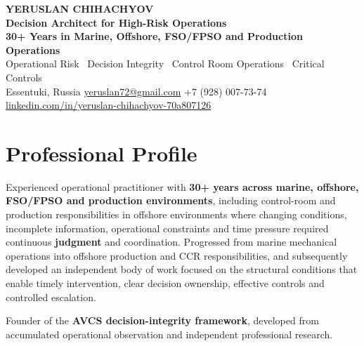 \documentclass[11pt,a4paper]{article}
\begin{document}
\begin{center}
    {\Huge\bfseries\color{avcsdark} YERUSLAN CHIHACHYOV} \\[6pt]
    {\large\bfseries Decision Architect for High-Risk Operations} \\[4pt]
    {\small\bfseries 30+ Years in Marine, Offshore, FSO/FPSO and Production Operations} \\[2pt]
    {\small Operational Risk \textbar\ Decision Integrity \textbar\ Control Room Operations \textbar\ Critical Controls} \\[6pt]
    {\small
        Essentuki, Russia \quad\textbar\quad
        \href{mailto:yeruslan72@gmail.com}{yeruslan72@gmail.com} \quad\textbar\quad
        +7 (928) 007-73-74 \quad\textbar\quad
        \href{https://linkedin.com/in/yeruslan-chihachyov-70a807126}{linkedin.com/in/yeruslan-chihachyov-70a807126}
    }
\end{center}

\vspace{0.8em}

\section*{Professional Profile}

Experienced operational practitioner with \textbf{30+ years across marine, offshore, FSO/FPSO and production environments}, including control-room and production responsibilities in offshore environments where changing conditions, incomplete information, operational constraints and time pressure required continuous \textbf{judgment} and coordination. Progressed from marine mechanical operations into offshore production and CCR responsibilities, and subsequently developed an independent body of work focused on the structural conditions that enable timely intervention, clear decision ownership, effective controls and controlled escalation.

Founder of the \textbf{AVCS decision-integrity framework}, developed from accumulated operational observation and independent professional research.

\end{document}
